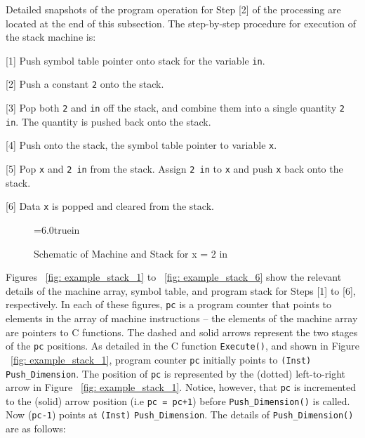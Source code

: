 \vspace{0.15 in}
\noindent\hspace{0.5 in}
Detailed snapshots of the program operation for Step [2] of the
processing are located at the end of this subsection.
The step-by-step procedure for execution of the stack machine is:

\vspace{0.15 in}\noindent
\begin{description} 
\item{[1]}
Push symbol table pointer onto stack for the variable {\tt in}.
\item{[2]}
Push a constant {\tt 2} onto the stack.
\item{[3]}
Pop both {\tt 2} and {\tt in} off the stack,
and combine them into a single quantity {\tt 2 in}.
The quantity is pushed back onto the stack.
\item{[4]}
Push onto the stack, the symbol table pointer to variable {\tt x}.
\item{[5]}
Pop {\tt x} and {\tt 2 in} from the stack. Assign {\tt 2 in} to {\tt x}
and push {\tt x} back onto the stack.
\item{[6]}
Data {\tt x} is popped and cleared from the stack. 
\end{description} 

\begin{figure}[t]
\epsfxsize=6.0truein
\centerline{}
\caption{Schematic of Machine and Stack for x = 2 in }
\label{fig: example_stack}
\end{figure}

\vspace{0.15 in}\noindent
Figures ~\ref{fig: example_stack_1} to ~\ref{fig: example_stack_6} show 
the relevant details of the machine array, symbol table, and program
stack for Steps [1] to [6], respectively. In each of these figures,
{\tt pc} is a program counter that points to elements in
the array of machine instructions -- the elements of the
machine array are pointers to C functions.
The dashed and solid arrows represent the two stages of the {\tt pc} positions.
As detailed in the C function {\tt Execute()}, and shown in Figure ~\ref{fig: example_stack_1},
program counter {\tt pc} initially points to {\tt (Inst)} {\tt Push\_Dimension}.
The position of {\tt pc} is represented by the (dotted)
left-to-right arrow in Figure ~\ref{fig: example_stack_1}.
Notice, however, that {\tt pc} is incremented to the (solid) arrow
position (i.e {\tt pc = pc+1}) before {\tt Push\_Dimension()} is called.
Now ({\tt pc-1}) points at {\tt (Inst)} {\tt Push\_Dimension}.
The details of {\tt Push\_Dimension()} are as follows:

